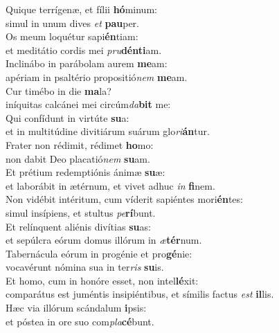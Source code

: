 \evenverse Quique terrígenæ, et fílii \textbf{hó}minum:~\*\\
\evenverse simul in unum dives \textit{et} \textbf{pau}per.\\
\oddverse Os meum loquétur sapi\textbf{én}tiam:~\*\\
\oddverse et meditátio cordis mei \textit{pru}\textbf{dén}\textbf{ti}am.\\
\evenverse Inclinábo in parábolam aurem \textbf{me}am:~\*\\
\evenverse apériam in psaltério propositió\textit{nem} \textbf{me}am.\\
\oddverse Cur timébo in die \textbf{ma}la?~\*\\
\oddverse iníquitas calcánei mei circúm\textit{da}\textbf{bit} me:\\
\evenverse Qui confídunt in virtúte \textbf{su}a:~\*\\
\evenverse et in multitúdine divitiárum suárum glo\textit{ri}\textbf{án}tur.\\
\oddverse Frater non rédimit, rédimet \textbf{ho}mo:~\*\\
\oddverse non dabit Deo placatió\textit{nem} \textbf{su}am.\\
\evenverse Et prétium redemptiónis ánimæ \textbf{su}æ:~\*\\
\evenverse et laborábit in ætérnum, et vivet adhuc \textit{in} \textbf{fi}nem.\\
\oddverse Non vidébit intéritum, cum víderit sapiéntes mori\textbf{én}tes:~\*\\
\oddverse simul insípiens, et stultus \textit{pe}\textbf{rí}bunt.\\
\evenverse Et relínquent aliénis divítias \textbf{su}as:~\*\\
\evenverse et sepúlcra eórum domus illórum in \textit{æ}\textbf{tér}num.\\
\oddverse Tabernácula eórum in progénie et pro\textbf{gé}nie:~\*\\
\oddverse vocavérunt nómina sua in ter\textit{ris} \textbf{su}is.\\
\evenverse Et homo, cum in honóre esset, non intel\textbf{lé}xit:~\*\\
\evenverse comparátus est juméntis insipiéntibus, et símilis factus \textit{est} \textbf{il}lis.\\
\oddverse Hæc via illórum scándalum \textbf{i}psis:~\*\\
\oddverse et póstea in ore suo com\textit{pla}\textbf{cé}bunt.\\
